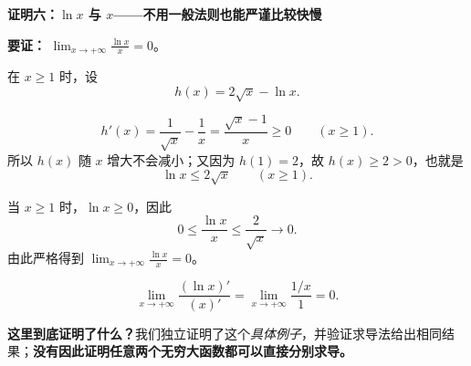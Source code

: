 \clearpage
\begin{proofbox}
\textbf{\textcolor{CProof}{证明六：$\ln x$ 与 $x$——不用一般法则也能严谨比较快慢}}

\textbf{要证：} $\displaystyle\lim_{x\to+\infty}\frac{\ln x}{x}=0$。

\begin{description}[style=nextline, leftmargin=2.5em, labelsep=0.4em, itemsep=0.45em]
\item[\textbf{第1步：构造一个更容易比较的式子。}]
在 $x\ge1$ 时，设
\[h(x)=2\sqrt{x}-\ln x.\]
\item[\textbf{第2步：只用高中求导比较它的大小。}]
\[
 h'(x)=\frac1{\sqrt{x}}-\frac1x
=\frac{\sqrt{x}-1}{x}\ge0\qquad(x\ge1).
\]
所以 $h(x)$ 随 $x$ 增大不会减小；又因为 $h(1)=2$，故 $h(x)\ge2>0$，也就是
\[\ln x\le2\sqrt{x}\qquad(x\ge1).\]
\item[\textbf{第3步：把分子分母一起除以 $x$。}]
当 $x\ge1$ 时，$\ln x\ge0$，因此
\[
 0\le\frac{\ln x}{x}\le\frac2{\sqrt{x}}\longrightarrow0.
\]
由此严格得到 $\displaystyle\lim_{x\to+\infty}\frac{\ln x}{x}=0$。
\item[\textbf{第4步：对照求导后的比值。}]
\[
 \lim_{x\to+\infty}\frac{(\ln x)'}{(x)'}
 =\lim_{x\to+\infty}\frac{1/x}{1}=0.
\]
\end{description}

\textbf{这里到底证明了什么？}我们独立证明了这个\emph{具体例子}，并验证求导法给出相同结果；\textbf{没有因此证明任意两个无穷大函数都可以直接分别求导。}
\end{proofbox}
